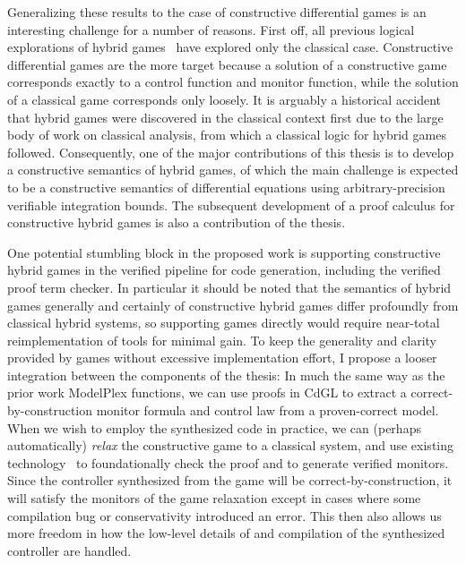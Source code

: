 \documentclass[12pt]{cmuthesis}
\theoremstyle{definition}
\theoremstyle{remark}
\newcommand{\CdGL}{\textsf{CdGL}\xspace}
\newcommand{\ModelPlex}{ModelPlex\xspace}
\begin{document}
Generalizing these results to the case of constructive differential games is an interesting challenge for a number of reasons.
First off, all previous logical explorations of hybrid games~\cite{DBLP:conf/cade/QueselP12,DBLP:journals/tocl/Platzer15,DBLP:journals/tocl/Platzer17,DBLP:conf/cade/Platzer18} have explored only the classical case.
Constructive differential games are the more target because a solution of a constructive game corresponds exactly to a control function and monitor function, while the solution of a classical game corresponds only loosely.
It is arguably a historical accident that hybrid games were discovered in the classical context first due to the large body of work on classical analysis, from which a classical logic for hybrid games followed.
Consequently, one of the major contributions of this thesis is to develop a constructive semantics of hybrid games, of which the main challenge is expected to be a constructive semantics of differential equations using arbitrary-precision verifiable integration bounds.
The subsequent development of a proof calculus for constructive hybrid games is also a contribution of the thesis.

One potential stumbling block in the proposed work is supporting constructive hybrid games in the verified pipeline for code generation, including the verified \dL proof term checker.
In particular it should be noted that the semantics of hybrid games generally and certainly of constructive hybrid games differ profoundly from classical hybrid systems, so supporting games directly would require near-total reimplementation of tools for minimal gain.
To keep the generality and clarity provided by games without excessive implementation effort, I propose a looser integration between the components of the thesis: In much the same way as the prior work \ModelPlex functions, we can use proofs in \CdGL to extract a correct-by-construction monitor formula and control law from a proven-correct model.
When we wish to employ the synthesized code in practice, we can (perhaps automatically) \emph{relax} the constructive game to a classical system, and use existing technology~\cite{DBLP:conf/pldi/BohrerTMMP18} to foundationally check the proof and to generate verified monitors.
Since the controller synthesized from the game will be correct-by-construction, it will satisfy the monitors of the game relaxation except in cases where some compilation bug or conservativity introduced an error.
This then also allows us more freedom in how the low-level details of and compilation of the synthesized controller are handled.
\end{document}
